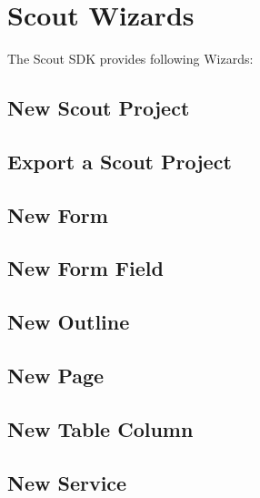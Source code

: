 \documentclass[a4paper,10pt,twoside]{book}
\begin{document}
\section*{Scout Wizards}

The Scout SDK provides following Wizards:
\subsection*{New Scout Project}

\subsection*{Export a Scout Project}

\subsection*{New Form}

\subsection*{New Form Field}

\subsection*{New Outline}

\subsection*{New Page}

\subsection*{New Table Column}

\subsection*{New Service}

\end{document}
